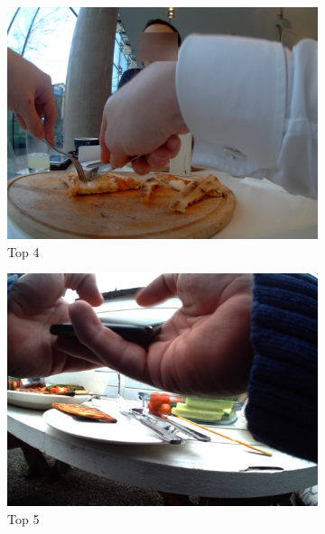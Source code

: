 \begin{figure}[H]
  \begin{subfigure}{0.32\textwidth}
    \includegraphics[width=\textwidth]{Sections/7Results/images/top4.jpg}\hfill
    \caption{Top 4}
  \end{subfigure}
  \begin{subfigure}{0.32\textwidth}
    \includegraphics[width=\textwidth]{Sections/7Results/images/top5.jpg}\hfill
    \caption{Top 5}
  \end{subfigure}
  \begin{subfigure}{0.32\textwidth}

\end{subfigure}
\end{figure}
